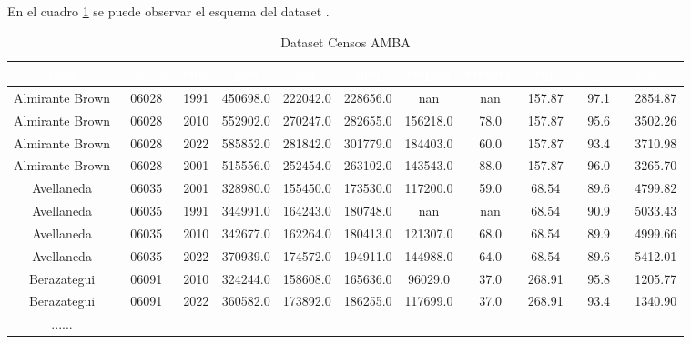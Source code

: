\documentclass{article}
\theoremstyle{mytheoremstyle}
\theoremstyle{mytheoremstyle}
\theoremstyle{myproblemstyle}
\begin{document}
En el cuadro \ref{tab:censos_amba} se puede observar el esquema del dataset .
\begin{table}[htb]
  \centering
  \footnotesize
  \begin{tabular}{|c|c|c|c|c|c|c|c|c|c|c|}
  \hline
    \textbf{\cellcolor[rgb]{0,0.231,0.427}\textcolor{white}{nam}} &
   \textbf{\cellcolor[rgb]{0,0.231,0.427}\textcolor{white}{$cod_depto$}} 
   & \textbf{\cellcolor[rgb]{0,0.231,0.427}\textcolor{white}{anio}} &
   \textbf{\cellcolor[rgb]{0,0.231,0.427}\textcolor{white}{pob}} & 
   \textbf{\cellcolor[rgb]{0,0.231,0.427}\textcolor{white}{var}} & 
   \textbf{\cellcolor[rgb]{0,0.231,0.427}\textcolor{white}{muj}} &
    \textbf{\cellcolor[rgb]{0,0.231,0.427}\textcolor{white}{vivpart}} & 
    \textbf{\cellcolor[rgb]{0,0.231,0.427}\textcolor{white}{vivtotal}} &
     \textbf{\cellcolor[rgb]{0,0.231,0.427}\textcolor{white}{sup}} &
      \textbf{\cellcolor[rgb]{0,0.231,0.427}\textcolor{white}{$ind_masc$}} &
       \textbf{\cellcolor[rgb]{0,0.231,0.427}\textcolor{white}{$dens_pob$}} \\
  \hline
  Almirante Brown & 06028 & 1991 & 450698.0 & 222042.0 & 228656.0 & nan & nan & 157.87 & 97.1 & 2854.87 \\
  Almirante Brown & 06028 & 2010 & 552902.0 & 270247.0 & 282655.0 & 156218.0 & 78.0 & 157.87 & 95.6 & 3502.26 \\
  Almirante Brown & 06028 & 2022 & 585852.0 & 281842.0 & 301779.0 & 184403.0 & 60.0 & 157.87 & 93.4 & 3710.98 \\
  Almirante Brown & 06028 & 2001 & 515556.0 & 252454.0 & 263102.0 & 143543.0 & 88.0 & 157.87 & 96.0 & 3265.70 \\
  Avellaneda & 06035 & 2001 & 328980.0 & 155450.0 & 173530.0 & 117200.0 & 59.0 & 68.54 & 89.6 & 4799.82 \\
  Avellaneda & 06035 & 1991 & 344991.0 & 164243.0 & 180748.0 & nan & nan & 68.54 & 90.9 & 5033.43 \\
  Avellaneda & 06035 & 2010 & 342677.0 & 162264.0 & 180413.0 & 121307.0 & 68.0 & 68.54 & 89.9 & 4999.66 \\
  Avellaneda & 06035 & 2022 & 370939.0 & 174572.0 & 194911.0 & 144988.0 & 64.0 & 68.54 & 89.6 & 5412.01 \\
  Berazategui & 06091 & 2010 & 324244.0 & 158608.0 & 165636.0 & 96029.0 & 37.0 & 268.91 & 95.8 & 1205.77 \\
  Berazategui & 06091 & 2022 & 360582.0 & 173892.0 & 186255.0 & 117699.0 & 37.0 & 268.91 & 93.4 & 1340.90 \\
  ...... &  &  &  &  &  & &  &  &  &  \\ \hline
  \end{tabular}
  \caption{Dataset Censos AMBA}
  \label{tab:censos_amba}
  \end{table}
  
\end{document}
